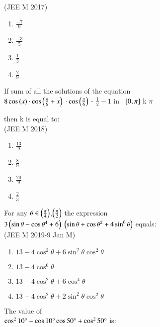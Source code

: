 \hfill{(JEE M 2017)}\\
    \begin{enumerate}
    \item $\frac{-7}{9}$ 
    \item $\frac{-3}{5}$
    \item $\frac{1}{3}$
    \item $\frac{2}{9}$\\
    \end{enumerate}
 \item If sum of all the solutions of the equation\\
  $8 \cos\left(x\right) \cdot \cos\left(\frac{\pi}{6} + x \right)$ $\cdot \cos \left(\frac{\pi}{6}\right)$ - $\frac{1}{2} - 1 \text{ in }$ ${}\left[0, \pi\right]$ k $\pi$

 then k is equal to:\\
 
\hfill{(JEE M 2018)}\\
\begin{enumerate}
\item $\frac{13}{9}$
\item $\frac{8}{9}$\\
\item  $\frac{20}{9}$
\item  $\frac{2}{3}$\\
\end{enumerate}
  \item For any $\theta \in \left(\frac{\pi}{4}\right)$,$\left(\frac{\pi}{2}\right)$ the expression\\
 $3\left(\sin\theta-\cos\theta^4 +6\right)$ $\left(\sin\theta+\cos\theta^2 +4\sin^{6}\theta\right)$ equals:\\
 
\hfill {(JEE M 2019-9 Jan  M)}\\
 \begin{enumerate}
 \item $13-4\cos^2\theta +6\sin^2\theta \cos^2\theta $\\
 \item  $13-4\cos^6\theta$\\
\item  $13-4\cos^2\theta +6\cos^4\theta$\\
 \item $13-4\cos^2\theta +2\sin^2\theta \cos^2\theta$\\
 \end{enumerate}
\item The value of\\ $\cos^210\degree-\cos10\degree\cos50\degree+\cos^250\degree$ is:\\

